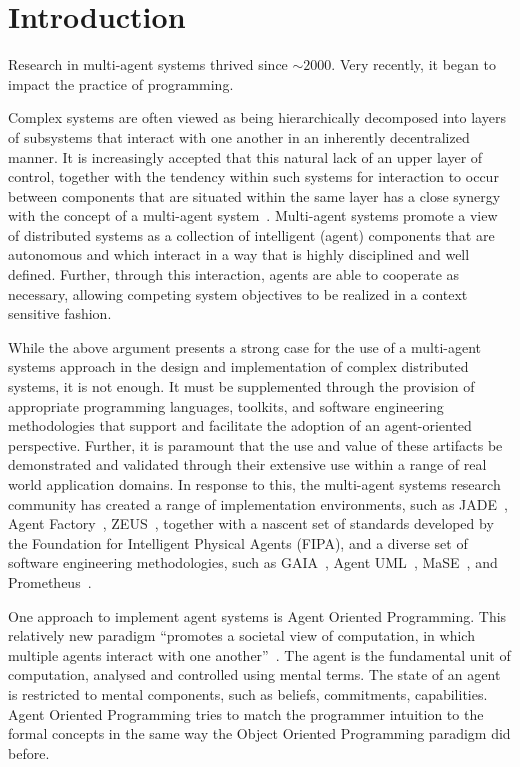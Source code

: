\documentclass[a4paper,12pt,oneside,fleqn]{book} %
\begin{document}

\chapter{Introduction}\label{ch:intro} %

Research in multi-agent systems thrived since $\sim2000$.
Very recently, it began to impact the practice of programming.

Complex systems are often viewed as being hierarchically decomposed into layers
of subsystems that interact with one another in an inherently decentralized
manner. It is increasingly accepted that this natural lack of an upper layer of
control, together with the tendency within such systems for interaction to
occur between components that are situated within the same layer has a close
synergy with the concept of a multi-agent
system~\cite{Jennings00agent-orientedsoftware}. Multi-agent systems promote a
view of distributed systems as a collection of intelligent (agent) components
that are autonomous and which interact in a way that is highly disciplined and
well defined. Further, through this interaction, agents are able to cooperate
as necessary, allowing competing system objectives to be realized in a context
sensitive fashion.

While the above argument presents a strong case for the use of a multi-agent
systems approach in the design and implementation of complex distributed
systems, it is not enough. It must be supplemented through the provision of
appropriate programming languages, toolkits, and software engineering
methodologies that support and facilitate the adoption of an agent-oriented
perspective. Further, it is paramount that the use and value of these artifacts
be demonstrated and validated through their extensive use within a range of
real world application domains. In response to this, the multi-agent systems
research community has created a range of implementation environments, such as
JADE~\cite{DBLP:books/sp/map2005/BellifemineBCP05}, Agent
Factory~\cite{collier1999agent}, ZEUS~\cite{DBLP:conf/agents/NwanaNLC99},
together with a nascent set of standards developed by the Foundation for
Intelligent Physical Agents (FIPA), and a diverse set of software engineering
methodologies, such as GAIA~\cite{DBLP:journals/aamas/WooldridgeJK00}, Agent
UML~\cite{bauer2001agent}, MaSE~\cite{deloach2001analysis}, and
Prometheus~\cite{DBLP:conf/atal/PadghamW02}.

One approach to implement agent systems is Agent Oriented Programming.
This relatively new paradigm ``promotes a societal view of computation, in
which multiple agents interact with one
another''~\cite{DBLP:journals/ai/Shoham93}.  The agent is the fundamental
unit of computation, analysed and controlled using mental terms.  The state
of an agent is restricted to mental components, such as beliefs,
commitments, capabilities. Agent Oriented Programming tries to match the
programmer intuition to the formal concepts in the same way the Object
Oriented Programming paradigm did before.
\end{document}
